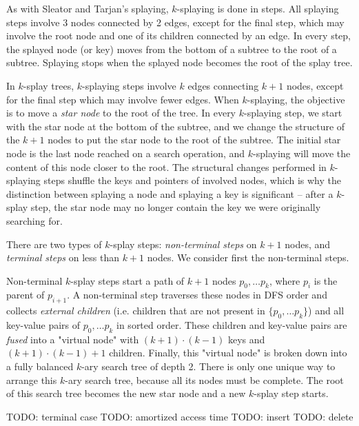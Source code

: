 As with Sleator and Tarjan's splaying, $k$-splaying is done in steps.
All splaying steps involve 3 nodes connected by 2 edges, except for the final
step, which may involve the root node and one of its children connected by
an edge. In every step, the splayed node (or key) moves from the bottom
of a subtree to the root of a subtree. Splaying stops when the splayed node
becomes the root of the splay tree.

In $k$-splay trees, $k$-splaying steps involve $k$ edges connecting
$k+1$ nodes, except for the final step which may involve fewer edges.
When $k$-splaying, the objective is to move a \textit{star node} to the
root of the tree. In every $k$-splaying step, we start with the star node
at the bottom of the subtree, and we change the structure of the $k+1$
nodes to put the star node to the root of the subtree.
The initial star node is the last node reached on a search operation, and
$k$-splaying will move the content of this node closer to the root.
The structural changes performed in $k$-splaying steps shuffle the keys and
pointers of involved nodes, which is why the distinction between splaying
a node and splaying a key is significant -- after a $k$-splay step,
the star node may no longer contain the key we were originally searching for.

There are two types of $k$-splay steps: \textit{non-terminal steps} on
$k+1$ nodes, and \textit{terminal steps} on less than $k+1$ nodes.
We consider first the non-terminal steps.

Non-terminal $k$-splay steps start a path of $k+1$ nodes $p_0,\ldots p_{k}$,
where $p_i$ is the parent of $p_{i+1}$. A non-terminal step traverses these
nodes in DFS order and collects \textit{external children} (i.e. children
that are not present in $\{p_0,\ldots p_k\}$) and all key-value pairs of
$p_0,\ldots p_k$ in sorted order.
These children and key-value pairs are \textit{fused} into a "virtual node"
with $(k+1)\cdot (k-1)$ keys and $(k+1)\cdot(k-1) + 1$ children. Finally,
this "virtual node" is broken down into a fully balanced $k$-ary
search tree of depth 2. There is only one unique way to arrange this
$k$-ary search tree, because all its nodes must be complete. The root of this
search tree becomes the new star node and a new $k$-splay step starts.

TODO: terminal case
TODO: amortized access time
TODO: insert
TODO: delete
